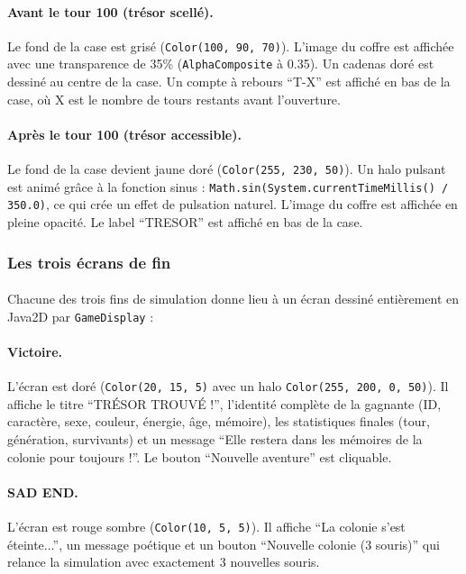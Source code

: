 \paragraph{Avant le tour 100 (trésor scellé).} Le fond de la case est grisé (\texttt{Color(100, 90, 70)}). L'image du coffre est affichée avec une transparence de 35\% (\texttt{AlphaComposite} à 0.35). Un cadenas doré est dessiné au centre de la case. Un compte à rebours ``T-X'' est affiché en bas de la case, où X est le nombre de tours restants avant l'ouverture.

\paragraph{Après le tour 100 (trésor accessible).} Le fond de la case devient jaune doré (\texttt{Color(255, 230, 50)}). Un halo pulsant est animé grâce à la fonction sinus : \texttt{Math.sin(System.currentTimeMillis() / 350.0)}, ce qui crée un effet de pulsation naturel. L'image du coffre est affichée en pleine opacité. Le label ``TRESOR'' est affiché en bas de la case.

\subsubsection{Les trois écrans de fin}

\paragraph{} Chacune des trois fins de simulation donne lieu à un écran dessiné entièrement en Java2D par \texttt{GameDisplay} :

\paragraph{Victoire.} L'écran est doré (\texttt{Color(20, 15, 5)} avec un halo \texttt{Color(255, 200, 0, 50)}). Il affiche le titre ``TRÉSOR TROUVÉ !'', l'identité complète de la gagnante (ID, caractère, sexe, couleur, énergie, âge, mémoire), les statistiques finales (tour, génération, survivants) et un message ``Elle restera dans les mémoires de la colonie pour toujours !''. Le bouton ``Nouvelle aventure'' est cliquable.

\paragraph{SAD END.} L'écran est rouge sombre (\texttt{Color(10, 5, 5)}). Il affiche ``La colonie s'est éteinte...'', un message poétique et un bouton ``Nouvelle colonie (3 souris)'' qui relance la simulation avec exactement 3 nouvelles souris.


